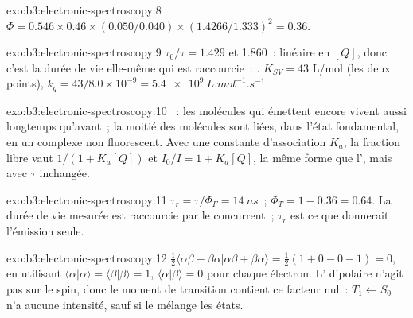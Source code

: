 \begin{solution}{exo:b3:electronic-spectroscopy:8}
$\Phi = 0.546 \times 0.46 \times (0.050/0.040) \times (1.4266/1.333)^2 = 0.36$.
\end{solution}

\begin{solution}{exo:b3:electronic-spectroscopy:9}
$\tau_0/\tau = 1.429$ et 1.860~: linéaire en $[Q]$, donc c'est la durée de
vie elle-même qui est raccourcie~: . $K_{SV} = 43$
L/mol (les deux points), $k_q = 43/8.0
\times 10^{-9} = \qty{5.4e9}{L.mol^{-1}.s^{-1}}$.
\end{solution}

\begin{solution}{exo:b3:electronic-spectroscopy:10}
~: les molécules qui émettent encore vivent aussi
longtemps qu'avant~; la moitié des molécules sont liées, dans l'état
fondamental, en un complexe non fluorescent. Avec une constante
d'association $K_a$, la fraction libre vaut $1/(1 + K_a[Q])$ et $I_0/I = 1 +
K_a[Q]$, la même forme que l', mais avec $\tau$
inchangée.
\end{solution}

\begin{solution}{exo:b3:electronic-spectroscopy:11}
$\tau_r = \tau/\Phi_F = \qty{14}{ns}$~; $\Phi_T = 1 - 0.36 = 0.64$. La
durée de vie mesurée est raccourcie par le 
concurrent~; $\tau_r$ est ce que donnerait l'émission seule.
\end{solution}

\begin{solution}{exo:b3:electronic-spectroscopy:12}
$\frac12\langle\alpha\beta - \beta\alpha|\alpha\beta + \beta\alpha\rangle = \frac12(1 + 0 - 0 - 1) = 0$, en utilisant
$\langle\alpha|\alpha\rangle = \langle\beta|\beta\rangle = 1$, $\langle\alpha|\beta\rangle = 0$ pour chaque électron.
L' dipolaire n'agit pas sur le spin, donc le moment de
transition contient ce facteur nul~: $T_1 \leftarrow S_0$ n'a aucune
intensité, sauf si le  mélange
les états.
\end{solution}

